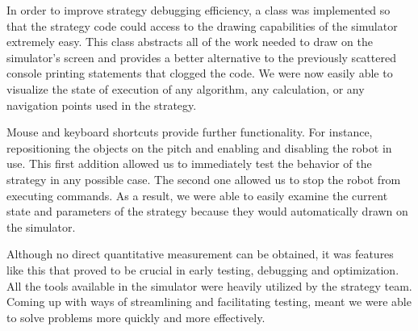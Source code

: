 In order to improve strategy debugging efficiency, a class was implemented so that the strategy code could access to the drawing capabilities of the simulator extremely easy. This class abstracts all of the work needed to draw on the simulator’s screen and provides a better alternative to the previously scattered console printing statements that clogged the code. We were now easily able to visualize the state of execution of any algorithm, any calculation, or any navigation points used in the strategy. \linebreak

Mouse and keyboard shortcuts provide further functionality. For instance, repositioning the objects on the pitch and enabling and disabling the robot in use. This first addition allowed us to immediately test the behavior of the strategy in any possible case. The second one allowed us to stop the robot from executing commands. As a result, we were able to easily examine the current state and parameters of the strategy because they would automatically drawn on the simulator. \linebreak

Although no direct quantitative measurement can be obtained, it was features like this that proved to be crucial in early testing, debugging and optimization. All the tools available in the simulator were heavily utilized by the strategy team. Coming up with ways of streamlining and facilitating testing, meant we were able to solve problems more quickly and more effectively.